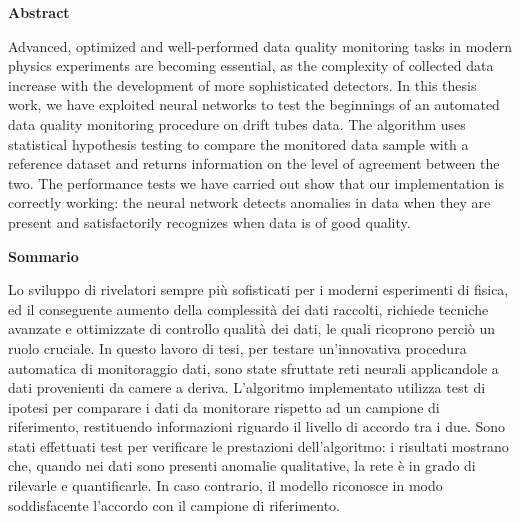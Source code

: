\vspace*{\fill}
\thispagestyle{plain}
\begingroup

    \begin{center}
        {{\large{\bf Abstract}}}
    \end{center}


    \begin{center}
        Advanced, optimized and well-performed data quality monitoring tasks in modern physics experiments are becoming
        essential, as the complexity of collected data increase with the development of more sophisticated detectors. In
        this thesis work, we have exploited neural networks to test the beginnings of an automated data quality
        monitoring procedure on drift tubes data. The algorithm uses statistical hypothesis testing to compare the
        monitored data sample with a reference dataset and returns information on the level of agreement between the
        two. The performance tests we have carried out show that our implementation is correctly working: the neural
        network detects anomalies in data when they are present and satisfactorily recognizes when data is of good
        quality.
        
    \end{center}

    \vspace{40mm}

    \begin{center}
        {{\large{\bf Sommario}}}
    \end{center}


    \begin{center}
        Lo sviluppo di rivelatori sempre più sofisticati per i moderni esperimenti di fisica, ed il conseguente aumento
        della complessità dei dati raccolti, richiede tecniche avanzate e ottimizzate di controllo qualità dei dati, le
        quali ricoprono perciò un ruolo cruciale. In questo lavoro di tesi, per testare un'innovativa procedura
        automatica di monitoraggio dati, sono state sfruttate reti neurali applicandole a dati provenienti da camere a
        deriva. L'algoritmo implementato utilizza test di ipotesi per comparare i dati da monitorare rispetto ad un
        campione di riferimento, restituendo informazioni riguardo il livello di accordo tra i due. Sono stati
        effettuati test per verificare le prestazioni dell'algoritmo: i risultati mostrano che, quando nei dati sono
        presenti anomalie qualitative, la rete è in grado di rilevarle e quantificarle. In caso contrario, il modello
        riconosce in modo soddisfacente l'accordo con il campione di riferimento.
    \end{center}

\endgroup

\vspace*{\fill}

